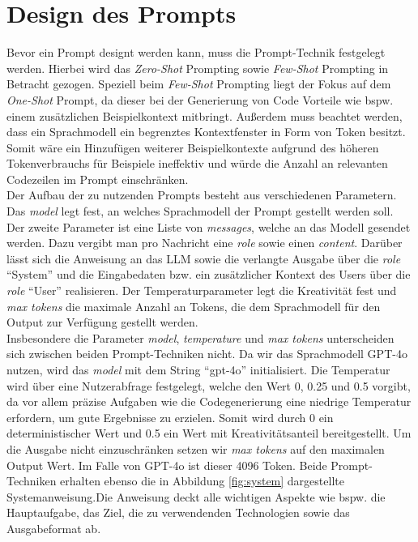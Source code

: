 \section{Design des Prompts}\label{section:prompt}
Bevor ein Prompt designt werden kann, muss die Prompt-Technik festgelegt werden. Hierbei wird das \textit{Zero-Shot} Prompting sowie \textit{Few-Shot} Prompting in Betracht gezogen. Speziell beim \textit{Few-Shot} Prompting liegt der Fokus auf dem \textit{One-Shot} Prompt, da dieser bei der Generierung von Code Vorteile wie bspw. einem zusätzlichen Beispielkontext mitbringt. Außerdem muss beachtet werden, dass ein Sprachmodell ein begrenztes Kontextfenster in Form von Token besitzt. Somit wäre ein Hinzufügen weiterer Beispielkontexte aufgrund des höheren Tokenverbrauchs für Beispiele ineffektiv und würde die Anzahl an relevanten Codezeilen im Prompt einschränken.\\
Der Aufbau der zu nutzenden Prompts besteht aus verschiedenen Parametern. Das \textit{model} legt fest, an welches Sprachmodell der Prompt gestellt werden soll. Der zweite Parameter ist eine Liste von \textit{messages}, welche an das Modell gesendet werden. Dazu vergibt man pro Nachricht eine \textit{role} sowie einen \textit{content}. Darüber lässt sich die Anweisung an das LLM sowie die verlangte Ausgabe über die \textit{role} ``System'' und die Eingabedaten bzw. ein zusätzlicher Kontext des Users über die \textit{role} ``User'' realisieren. Der Temperaturparameter legt die Kreativität fest und \textit{max tokens} die maximale Anzahl an Tokens, die dem Sprachmodell für den Output zur Verfügung gestellt werden.\\
Insbesondere die Parameter \textit{model}, \textit{temperature} und \textit{max tokens} unterscheiden sich zwischen beiden Prompt-Techniken nicht. Da wir das Sprachmodell GPT-4o nutzen, wird das \textit{model} mit dem String ``gpt-4o'' initialisiert. Die Temperatur wird über eine Nutzerabfrage festgelegt, welche den Wert 0, 0.25 und 0.5 vorgibt, da vor allem präzise Aufgaben wie die Codegenerierung eine niedrige Temperatur erfordern, um gute Ergebnisse zu erzielen. \cite*{renzeEffectSamplingTemperature2024} Somit wird durch 0 ein deterministischer Wert und 0.5 ein Wert mit Kreativitätsanteil bereitgestellt. Um die Ausgabe nicht einzuschränken setzen wir \textit{max tokens} auf den maximalen Output Wert. Im Falle von GPT-4o ist dieser 4096 Token. Beide Prompt-Techniken erhalten ebenso die in Abbildung \ref{fig:system} dargestellte Systemanweisung.Die Anweisung deckt alle wichtigen Aspekte wie bspw. die Hauptaufgabe, das Ziel, die zu verwendenden Technologien sowie das Ausgabeformat ab. \\
